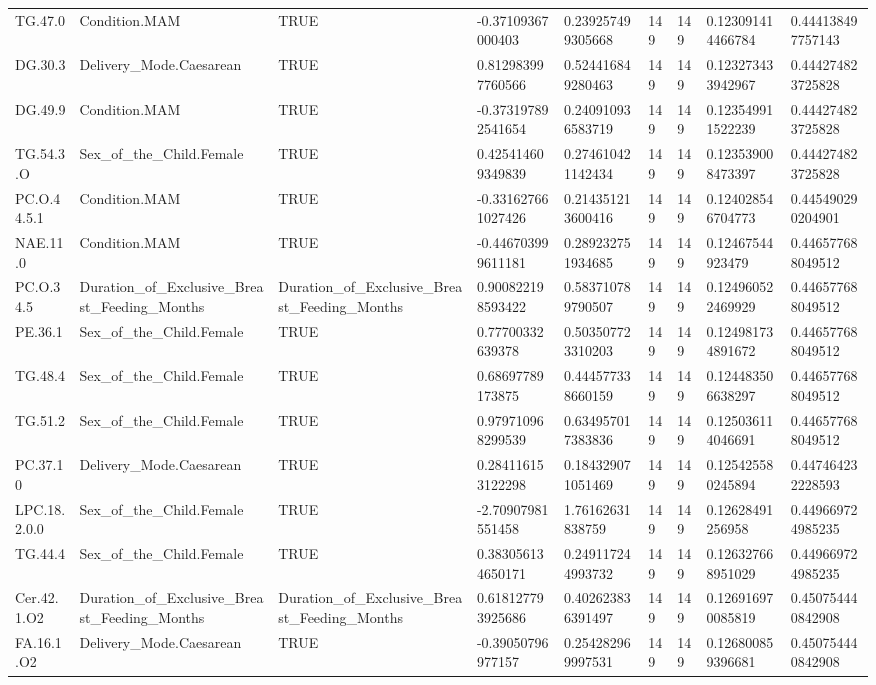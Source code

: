 \begin{longtable}{lllllllll}
TG.47.0 & Condition.MAM & TRUE & -0.37109367000403 & 0.239257499305668 & 149 & 149 & 0.123091414466784 & 0.444138497757143 \\
DG.30.3 & Delivery\_Mode.Caesarean & TRUE & 0.812983997760566 & 0.524416849280463 & 149 & 149 & 0.123273433942967 & 0.444274823725828 \\
DG.49.9 & Condition.MAM & TRUE & -0.373197892541654 & 0.240910936583719 & 149 & 149 & 0.123549911522239 & 0.444274823725828 \\
TG.54.3.O & Sex\_of\_the\_Child.Female & TRUE & 0.425414609349839 & 0.274610421142434 & 149 & 149 & 0.123539008473397 & 0.444274823725828 \\
PC.O.44.5.1 & Condition.MAM & TRUE & -0.331627661027426 & 0.214351213600416 & 149 & 149 & 0.124028546704773 & 0.445490290204901 \\
NAE.11.0 & Condition.MAM & TRUE & -0.446703999611181 & 0.289232751934685 & 149 & 149 & 0.12467544923479 & 0.446577688049512 \\
PC.O.34.5 & Duration\_of\_Exclusive\_Breast\_Feeding\_Months & Duration\_of\_Exclusive\_Breast\_Feeding\_Months & 0.900822198593422 & 0.583710789790507 & 149 & 149 & 0.124960522469929 & 0.446577688049512 \\
PE.36.1 & Sex\_of\_the\_Child.Female & TRUE & 0.77700332639378 & 0.503507723310203 & 149 & 149 & 0.124981734891672 & 0.446577688049512 \\
TG.48.4 & Sex\_of\_the\_Child.Female & TRUE & 0.68697789173875 & 0.444577338660159 & 149 & 149 & 0.124483506638297 & 0.446577688049512 \\
TG.51.2 & Sex\_of\_the\_Child.Female & TRUE & 0.979710968299539 & 0.634957017383836 & 149 & 149 & 0.125036114046691 & 0.446577688049512 \\
PC.37.10 & Delivery\_Mode.Caesarean & TRUE & 0.284116153122298 & 0.184329071051469 & 149 & 149 & 0.125425580245894 & 0.447464232228593 \\
LPC.18.2.0.0 & Sex\_of\_the\_Child.Female & TRUE & -2.70907981551458 & 1.76162631838759 & 149 & 149 & 0.12628491256958 & 0.449669724985235 \\
TG.44.4 & Sex\_of\_the\_Child.Female & TRUE & 0.383056134650171 & 0.249117244993732 & 149 & 149 & 0.126327668951029 & 0.449669724985235 \\
Cer.42.1.O2 & Duration\_of\_Exclusive\_Breast\_Feeding\_Months & Duration\_of\_Exclusive\_Breast\_Feeding\_Months & 0.618127793925686 & 0.402623836391497 & 149 & 149 & 0.126916970085819 & 0.450754440842908 \\
FA.16.1.O2 & Delivery\_Mode.Caesarean & TRUE & -0.39050796977157 & 0.254282969997531 & 149 & 149 & 0.126800859396681 & 0.450754440842908 \\

\end{longtable}
